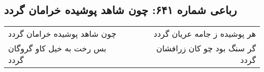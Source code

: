 \begin{center}
\section*{رباعی شماره ۶۴۱: چون شاهد پوشیده خرامان گردد}
\label{sec:0641}
\begin{longtable}{l p{0.5cm} r}
چون شاهد پوشیده خرامان گردد
&&
هر پوشیده ز جامه عریان گردد
\\
بس رخت به خیل کاو گروگان گردد
&&
گر سنگ بود چو کان زرافشان گردد
\\
\end{longtable}
\end{center}
